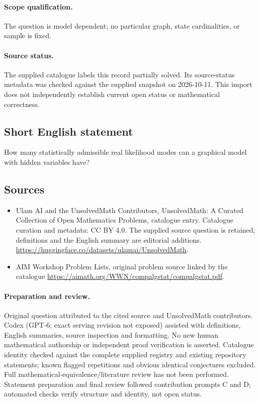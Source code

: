 \documentclass[11pt]{article}
\begin{document}
\paragraph{Scope qualification.}
The question is model dependent; no particular graph, state cardinalities, or sample is fixed.
\paragraph{Source status.}
The supplied catalogue labels this record partially solved. Its source-status metadata was checked against the supplied snapshot on 2026-10-11. This import does not independently establish current open status or mathematical correctness.
\subsection{Short English statement}
How many statistically admissible real likelihood modes can a graphical model with hidden variables have?
\subsection{Sources}
\begin{itemize}
\item[S1] Ulam AI and the UnsolvedMath Contributors, UnsolvedMath: A Curated Collection of Open Mathematics Problems, catalogue entry. Catalogue curation and metadata: CC BY 4.0. The supplied source question is retained; definitions and the English summary are editorial additions.
\url{https://huggingface.co/datasets/ulamai/UnsolvedMath}.
\item[S2] AIM Workshop Problem Lists, original problem source linked by the catalogue
\url{https://aimath.org/WWN/compalgstat/compalgstat.pdf}.
\end{itemize}
\paragraph{Preparation and review.}
Original question attributed to the cited source and UnsolvedMath contributors. Codex (GPT-6; exact serving revision not exposed) assisted with definitions, English summaries, source inspection and formatting. No new human mathematical authorship or independent proof verification is asserted. Catalogue identity checked against the complete supplied registry and existing repository statements; known flagged repetitions and obvious identical conjectures excluded. Full mathematical-equivalence/literature review has not been performed. Statement preparation and final review followed contribution prompts C and D; automated checks verify structure and identity, not open status.
\label{end:statement}
\end{document}
